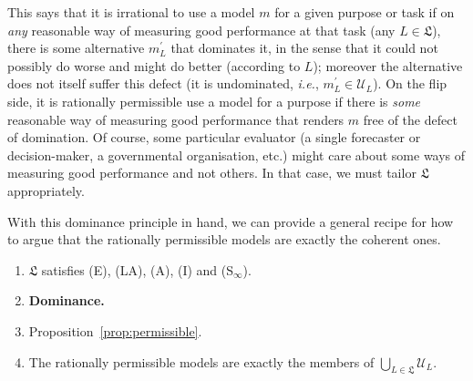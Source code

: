 \documentclass[11pt]{article}
\theoremstyle{definition}
\theoremstyle{remark}
\newcommand{\U}{\mathcal U}
\begin{document}
This says that it is irrational to use a model $m$ for a given purpose or task if on \textit{any} reasonable way of measuring good performance at that task (any $L\in\mathfrak L$), there is some alternative $m_L^\prime$ that dominates it, in the sense that it could not possibly do worse and might do better (according to $L$); moreover the alternative does not itself suffer this defect (it is undominated, \textit{i.e.}, $m_L^\prime\in\U_L$). On the flip side, it is rationally permissible use a model for a purpose if there is \textit{some} reasonable way of measuring good performance that renders $m$ free of the defect of domination. Of course, some particular evaluator (a single forecaster or decision-maker, a governmental organisation, etc.) might care about some ways of measuring good performance and not others. In that case, we must tailor $\mathfrak L$ appropriately.


With this dominance principle in hand, we can provide a general recipe for how to argue that the rationally permissible models are exactly the coherent ones. 

\begin{enumerate}[label=\textbf{(P\arabic*)},leftmargin=*]
\item $\mathfrak L$ satisfies (E), (LA), (A), (I) and (S$_\infty$).
\item \textbf{Dominance.}
\item Proposition~\ref{prop:permissible}.
\item[\textbf{(C)}] The rationally permissible models are exactly the members of $\bigcup_{L\in\mathfrak L}\U_L$. 

\end{enumerate}

\newpage
\end{document}
